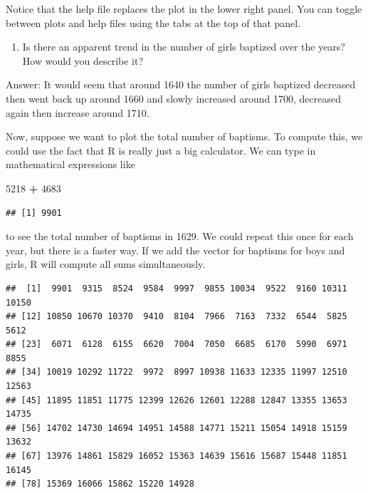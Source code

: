 \documentclass[]{article}
\newenvironment{Shaded}{\begin{snugshade}}{\end{snugshade}}
\newcommand{\DecValTok}[1]{\textcolor[rgb]{0.00,0.00,0.81}{#1}}
\newcommand{\StringTok}[1]{\textcolor[rgb]{0.31,0.60,0.02}{#1}}
\newcommand{\OperatorTok}[1]{\textcolor[rgb]{0.81,0.36,0.00}{\textbf{#1}}}
\newcommand{\NormalTok}[1]{#1}
\providecommand{\tightlist}{%
  \setlength{\itemsep}{0pt}\setlength{\parskip}{0pt}}
\begin{document}
Notice that the help file replaces the plot in the lower right panel.
You can toggle between plots and help files using the tabs at the top of
that panel.

\begin{enumerate}
\def\labelenumi{\arabic{enumi}.}
\setcounter{enumi}{1}
\tightlist
\item
  Is there an apparent trend in the number of girls baptized over the
  years?\\
  How would you describe it?
\end{enumerate}

Answer: It would seem that around 1640 the number of girls baptized
decreased then went back up around 1660 and slowly increased around
1700, decreased again then increase around 1710.

Now, suppose we want to plot the total number of baptisms. To compute
this, we could use the fact that R is really just a big calculator. We
can type in mathematical expressions like

\begin{Shaded}
\begin{Highlighting}[]
\DecValTok{5218} \OperatorTok{+}\StringTok{ }\DecValTok{4683}
\end{Highlighting}
\end{Shaded}

\begin{verbatim}
## [1] 9901
\end{verbatim}

to see the total number of baptisms in 1629. We could repeat this once
for each year, but there is a faster way. If we add the vector for
baptisms for boys and girls, R will compute all sums simultaneously.

\begin{Shaded}
\end{Shaded}

\begin{verbatim}
##  [1]  9901  9315  8524  9584  9997  9855 10034  9522  9160 10311 10150
## [12] 10850 10670 10370  9410  8104  7966  7163  7332  6544  5825  5612
## [23]  6071  6128  6155  6620  7004  7050  6685  6170  5990  6971  8855
## [34] 10019 10292 11722  9972  8997 10938 11633 12335 11997 12510 12563
## [45] 11895 11851 11775 12399 12626 12601 12288 12847 13355 13653 14735
## [56] 14702 14730 14694 14951 14588 14771 15211 15054 14918 15159 13632
## [67] 13976 14861 15829 16052 15363 14639 15616 15687 15448 11851 16145
## [78] 15369 16066 15862 15220 14928
\end{verbatim}
\end{document}
